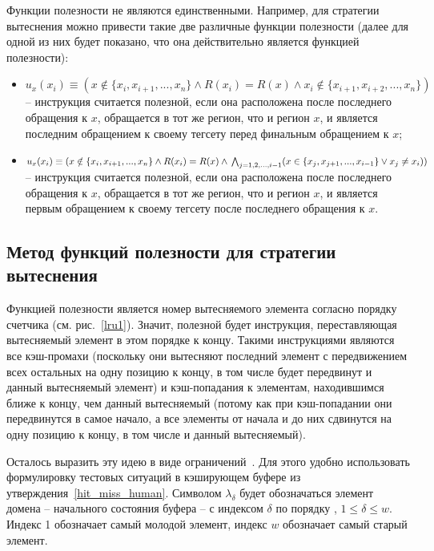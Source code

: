 Функции полезности не являются единственными. Например, для стратегии вытеснения \LRU можно привести такие две различные функции полезности (далее для одной из них будет показано, что она действительно является функцией полезности):
\begin{itemize}
  \item $u_x(x_i) \equiv (x \notin \{x_i, x_{i+1}, ..., x_n\} \wedge R(x_i) = R(x) \wedge x_i \notin \{x_{i+1}, x_{i+2}, ..., x_n\})$ -- инструкция считается полезной, если она расположена после последнего обращения к $x$, обращается в тот же регион, что и регион $x$, и является последним обращением к своему тегсету перед финальным обращением к $x$;
  \item $u_x(x_i) \equiv (x \notin \{x_i, x_{i+1}, ..., x_n\} \wedge R(x_i) = R(x) \wedge \\ \bigwedge_{j=1,2,...,i-1} (x \in \{x_j, x_{j+1}, ..., x_{i-1}\} \vee x_j \neq x_i))$ -- инструкция считается полезной, если она расположена после последнего обращения к $x$, обращается в тот же регион, что и регион $x$, и является первым обращением к своему тегсету после последнего обращения к $x$.
\end{itemize}

\subsection{Метод функций полезности для стратегии
вытеснения \LRU}

Функцией полезности является номер вытесняемого элемента согласно
порядку счетчика \LRU (см. рис.~\ref{lru1}). Значит, полезной будет
инструкция, переставляющая вытесняемый элемент в этом порядке к
концу. Такими инструкциями являются все кэш-промахи (поскольку они
вытесняют последний элемент с передвижением всех остальных на одну
позицию к концу, в том числе будет передвинут и данный вытесняемый
элемент) и кэш-попадания к элементам, находившимся ближе к концу,
чем данный вытесняемый (потому как при кэш-попадании они
передвинутся в самое начало, а все элементы от начала и до них
сдвинутся на одну позицию к концу, в том числе и данный
вытесняемый).

Осталось выразить эту идею в виде ограничений~\cite{my_ewdts_2009}.
Для этого удобно использовать формулировку тестовых ситуаций в
кэширующем буфере из утверждения~\ref{hit_miss_human}. Символом
$\lambda_\delta$ будет обозначаться элемент домена -- начального
состояния буфера -- с индексом $\delta$ по порядку \LRU, $1
\leqslant \delta \leqslant w$. Индекс 1 обозначает самый молодой
элемент, индекс $w$ обозначает самый старый элемент.

